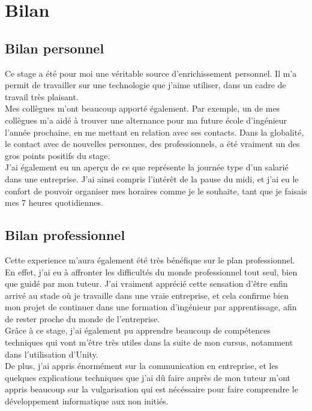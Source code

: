 \documentclass[a4paper]{article}
\begin{document}
    \section{Bilan}
    
    \subsection{Bilan personnel}

        Ce stage a été pour moi une véritable source d'enrichissement personnel. Il m'a permit de travailler sur une technologie que j'aime utiliser, dans un cadre de travail très plaisant. \\

        Mes collègues m'ont beaucoup apporté également. Par exemple, un de mes collègues m'a aidé à trouver une alternance pour ma future école d'ingénieur l'année prochaine, en me mettant en relation avec ses contacts. Dans la globalité, le contact avec de nouvelles personnes, des professionnels, a été vraiment un des gros points positifs du stage. \\

        J'ai également eu un aperçu de ce que représente la journée type d'un salarié dans une entreprise. J'ai ainsi compris l'intérêt de la pause du midi, et j'ai eu le confort de pouvoir organiser mes horaires comme je le souhaite, tant que je faisais mes 7 heures quotidiennes. \\

    \subsection{Bilan professionnel}

    Cette experience m'aura également été très bénéfique sur le plan professionnel. En effet, j'ai eu à affronter les difficultés du monde professionnel tout seul, bien que guidé par mon tuteur. J'ai vraiment apprécié cette sensation d'être enfin arrivé au stade où je travaille dans une vraie entreprise, et cela confirme bien mon projet de continuer dans une formation d'ingénieur par apprentissage, afin de rester proche du monde de l'entreprise. \\

    Grâce à ce stage, j'ai également pu apprendre beaucoup de compétences techniques qui vont m'être très utiles dans la suite de mon cursus, notamment dans l'utilisation d'Unity. \\ 

    De plus, j'ai appris énormément sur la communication en entreprise, et les quelques explications techniques que j'ai dû faire auprès de mon tuteur m'ont appris beaucoup sur la vulgarisation qui est nécéssaire pour faire comprendre le développement informatique aux non initiés. \\ 
\end{document}
